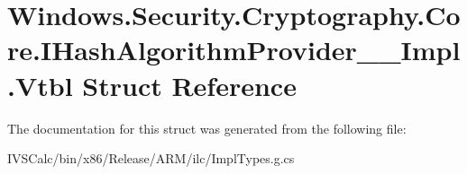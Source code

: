 \hypertarget{struct_windows_1_1_security_1_1_cryptography_1_1_core_1_1_i_hash_algorithm_provider_____impl_1_1_vtbl}{}\section{Windows.\+Security.\+Cryptography.\+Core.\+I\+Hash\+Algorithm\+Provider\+\_\+\+\_\+\+Impl.\+Vtbl Struct Reference}
\label{struct_windows_1_1_security_1_1_cryptography_1_1_core_1_1_i_hash_algorithm_provider_____impl_1_1_vtbl}


The documentation for this struct was generated from the following file\+:\begin{DoxyCompactItemize}
\item 
I\+V\+S\+Calc/bin/x86/\+Release/\+A\+R\+M/ilc/Impl\+Types.\+g.\+cs\end{DoxyCompactItemize}
